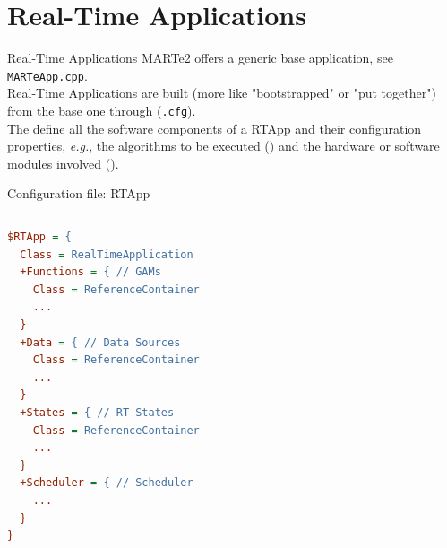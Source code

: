 
\section{Real-Time Applications}
\graphicspath{{figs/section3/}}

\begin{frame}{Real-Time Applications}
		MARTe2 offers a generic base application, see \texttt{MARTeApp.cpp}.\\
    \bigskip
		Real-Time Applications are built (more like "bootstrapped" or "put together") from the base one through  (\texttt{.cfg}).\\
    \bigskip
		The  define all the software components of a RTApp and their configuration properties, \emph{e.g.}, the algorithms to be executed () and the hardware or software modules involved ().
\end{frame}

\begin{frame}[fragile]{Configuration file: RTApp}
	\begin{columns}
		\begin{lstlisting}[style=small, language=cfg, caption=RTApp high-level configuration structure.]
$RTApp = {
  Class = RealTimeApplication
  +Functions = { // GAMs
    Class = ReferenceContainer
    ...
  }
  +Data = { // Data Sources
    Class = ReferenceContainer
    ...
  }
  +States = { // RT States
    Class = ReferenceContainer
    ...
  }
  +Scheduler = { // Scheduler
    ...
  }
}\end{lstlisting}
	\end{columns}
\end{frame}

